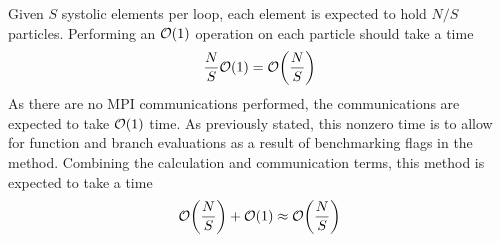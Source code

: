 %

Given $S$ systolic elements per loop, each element is expected to
hold $N/S$ particles.
%
Performing an $\mathcal{O}{\left({ 1 }\right)}$ operation on each particle should take a time
\begin{equation}
    \frac{N}{S}\mathcal{O}{\left({ 1 }\right)} = \mathcal{O}{\left({ \frac{N}{S} }\right)}
\end{equation}
%
As there are no MPI communications performed, the communications are expected
to take $\mathcal{O}{\left({ 1 }\right)}$ time.
%
As previously stated, this nonzero time is to allow for function
and branch evaluations as a result of benchmarking flags in the method.
%
Combining the calculation and communication terms, this method
is expected to take a time
\begin{equation}
    \mathcal{O}{\left({ \frac{N}{S} }\right)} + \mathcal{O}{\left({ 1 }\right)} \approx{} \mathcal{O}{\left({ \frac{N}{S} }\right)}
\end{equation}

%
%
\begin{figure}[!h]
    
    \caption{}
    \label{fig:v1_replicated_systolic_individual_operation_512_time}
\end  {figure}

\begin{figure}[!h]
    
    \caption{}
    \label{fig:v1_replicated_systolic_individual_operation_4096_time}
\end  {figure}

\begin{figure}[!h]
    
    \caption{}
    \label{fig:v1_replicated_systolic_individual_operation_32768_time}
\end  {figure}


\vZeroTimeExplanation
    {}
    {}
    {}
    {\individualoperation{}}
    {\replicatedsystolicloop{}}

